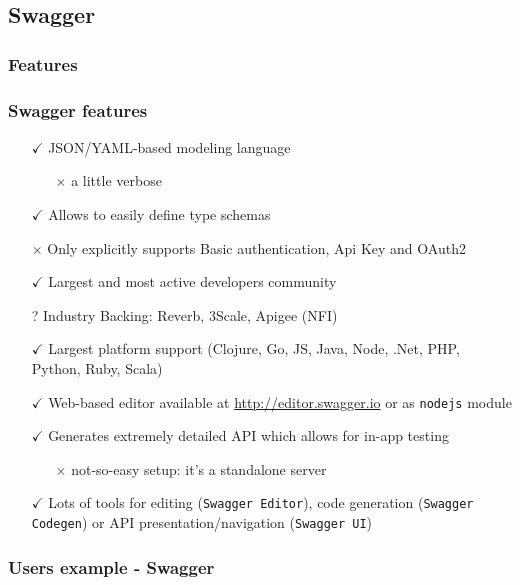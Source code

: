 \subsection{Swagger}

\subsubsection{Features}

\begin{frame} %
	\frametitle{Swagger features}
	
	\begin{itemize}
		\item[$\checkmark$] JSON/YAML-based modeling language
		\begin{itemize}
			\item[$\times$] a little verbose
		\end{itemize} 
		\item[$\checkmark$] Allows to easily define type schemas
		\item[$\times$] Only explicitly supports Basic authentication, Api Key and OAuth2
		\item[$\checkmark$] Largest and most active developers community
		\item[?] Industry Backing: Reverb, 3Scale, Apigee (NFI)
		\item[$\checkmark$] Largest platform support (Clojure, Go, JS, Java, Node, .Net, PHP, Python, Ruby, Scala)
		\item[$\checkmark$] Web-based editor available at \url{http://editor.swagger.io} or as \texttt{nodejs} module
		\item[$\checkmark$] Generates extremely detailed API which allows for in-app testing
		\begin{itemize}
			\item[$\times$] not-so-easy setup: it's a standalone server
		\end{itemize} 
		\item[$\checkmark$] Lots of tools for editing (\texttt{Swagger Editor}), code generation (\texttt{Swagger Codegen}) or API presentation/navigation (\texttt{Swagger UI})
	\end{itemize}
\end{frame}

\subsubsection{Users example - Swagger}

